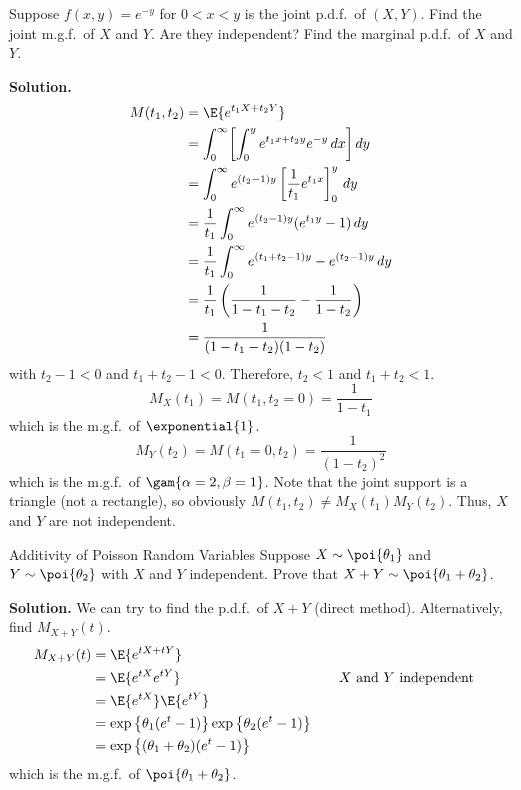 \begin{Example}{}{}
    Suppose $ f(x,y)=e^{-y} $ for $ 0<x<y $ is the joint p.d.f.\
    of $ (X,Y) $. Find the joint m.g.f.\ of $ X $ and $ Y $.
    Are they independent? Find the marginal p.d.f.\ of $ X $ and $ Y $.

    \textbf{Solution.}
    \begin{align*}
        M(t_1,t_2)
         & =\E{e^{t_1X+t_2Y}}                                                  \\
         & =\int_{0}^{\infty}
        \biggl[\int_{0}^{y} e^{t_1 x+ t_2 y}e^{-y}\, d{x} \biggr]\, d{y}       \\
         & =\int_{0}^{\infty} e^{(t_2-1)y}
        \left[ \frac{1}{t_1} e^{t_1 x} \right]_0^y \, d{y}                     \\
         & =\frac{1}{t_1} \int_{0}^{\infty} e^{(t_2-1)y}(e^{t_1 y}-1)\, d{y}   \\
         & =\frac{1}{t_1} \int_{0}^{\infty}
        e^{(t_1+t_2-1)y}-e^{(t_2-1)y}\, d{y}                                   \\
         & =\frac{1}{t_1} \left( \frac{1}{1-t_1-t_2} -\frac{1}{1-t_2}  \right) \\
         & =\frac{1}{(1-t_1-t_2)(1-t_2)}
    \end{align*}
    with $ t_2-1<0 $ and $ t_1+t_2-1<0 $. Therefore,
    $ t_2<1 $ and $ t_1+t_2<1 $.
    \[ M_X(t_1)=M(t_1,t_2=0)=\frac{1}{1-t_1} \]
    which is the m.g.f.\ of $ \exponential{1} $.
    \[ M_Y(t_2)=M(t_1=0,t_2)=\frac{1}{(1-t_2)^2} \]
    which is the m.g.f.\ of $ \gam{\alpha=2,\beta=1} $.
    Note that the joint support is a triangle (not a rectangle),
    so obviously $ M(t_1,t_2)\neq M_X(t_1)M_Y(t_2) $. Thus,
    $ X $ and $ Y $ are not independent.
\end{Example}
\begin{Example}{Additivity of Poisson Random Variables}{}
    Suppose $ X \sim \poi{\theta_1} $ and $ Y \sim \poi{\theta_2} $
    with $ X $ and $ Y $ independent. Prove
    that $ X+Y \sim \poi{\theta_1+\theta_2} $.

    \textbf{Solution.} We can try to find the p.d.f.\ of $ X+Y $
    (direct method). Alternatively, find $ M_{X+Y}(t) $.
    \begin{align*}
        M_{X+Y}(t)
         & =\E{e^{tX+tY}}                                                                                                   \\
         & =\E{e^{tX}e^{tY}}                                                       & \quad & \text{$X$ and $Y$ independent} \\
         & =\E{e^{tX}}\E{e^{tY}}                                                                                            \\
         & =\exp\left\{ \theta_1(e^t-1)\right\}\exp\left\{ \theta_2(e^t-1)\right\}                                          \\
         & =\exp\left\{ (\theta_1+\theta_2)(e^t-1)\right\}
    \end{align*}
    which is the m.g.f.\ of $ \poi{\theta_1+\theta_2} $.
\end{Example}
